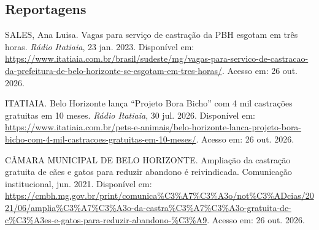 \documentclass[12pt,a4paper]{article}
\begin{document}
\subsection*{Reportagens}
\begin{enumerate}[label={[\arabic*]},leftmargin=1.3cm,itemsep=0.2em,resume]
\item SALES, Ana Luisa. Vagas para serviço de castração da PBH esgotam em três horas. \textit{Rádio Itatiaia}, 23 jan. 2023. Disponível em: \url{https://www.itatiaia.com.br/brasil/sudeste/mg/vagas-para-servico-de-castracao-da-prefeitura-de-belo-horizonte-se-esgotam-em-tres-horas/}. Acesso em: 26 out. 2026.
\item ITATIAIA. Belo Horizonte lança “Projeto Bora Bicho” com 4 mil castrações gratuitas em 10 meses. \textit{Rádio Itatiaia}, 30 jul. 2026. Disponível em: \url{https://www.itatiaia.com.br/pets-e-animais/belo-horizonte-lanca-projeto-bora-bicho-com-4-mil-castracoes-gratuitas-em-10-meses/}. Acesso em: 26 out. 2026.
\item CÂMARA MUNICIPAL DE BELO HORIZONTE. Ampliação da castração gratuita de cães e gatos para reduzir abandono é reivindicada. Comunicação institucional, jun. 2021. Disponível em: \url{https://cmbh.mg.gov.br/print/comunica%C3%A7%C3%A3o/not%C3%ADcias/2021/06/amplia%C3%A7%C3%A3o-da-castra%C3%A7%C3%A3o-gratuita-de-c%C3%A3es-e-gatos-para-reduzir-abandono-%C3%A9}. Acesso em: 26 out. 2026.
\end{enumerate}
\normalsize
\end{document}
